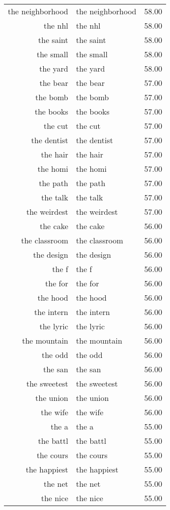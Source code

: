 \begin{table}[ht]
\begin{tabular}{rlr}
  the neighborhood & the neighborhood & 58.00 \\ 
  the nhl & the nhl & 58.00 \\ 
  the saint & the saint & 58.00 \\ 
  the small & the small & 58.00 \\ 
  the yard & the yard & 58.00 \\ 
  the bear & the bear & 57.00 \\ 
  the bomb & the bomb & 57.00 \\ 
  the books & the books & 57.00 \\ 
  the cut & the cut & 57.00 \\ 
  the dentist & the dentist & 57.00 \\ 
  the hair & the hair & 57.00 \\ 
  the homi & the homi & 57.00 \\ 
  the path & the path & 57.00 \\ 
  the talk & the talk & 57.00 \\ 
  the weirdest & the weirdest & 57.00 \\ 
  the cake & the cake & 56.00 \\ 
  the classroom & the classroom & 56.00 \\ 
  the design & the design & 56.00 \\ 
  the f & the f & 56.00 \\ 
  the for & the for & 56.00 \\ 
  the hood & the hood & 56.00 \\ 
  the intern & the intern & 56.00 \\ 
  the lyric & the lyric & 56.00 \\ 
  the mountain & the mountain & 56.00 \\ 
  the odd & the odd & 56.00 \\ 
  the san & the san & 56.00 \\ 
  the sweetest & the sweetest & 56.00 \\ 
  the union & the union & 56.00 \\ 
  the wife & the wife & 56.00 \\ 
  the a & the a & 55.00 \\ 
  the battl & the battl & 55.00 \\ 
  the cours & the cours & 55.00 \\ 
  the happiest & the happiest & 55.00 \\ 
  the net & the net & 55.00 \\ 
  the nice & the nice & 55.00 \\ 

\end{tabular}
\end{table}
